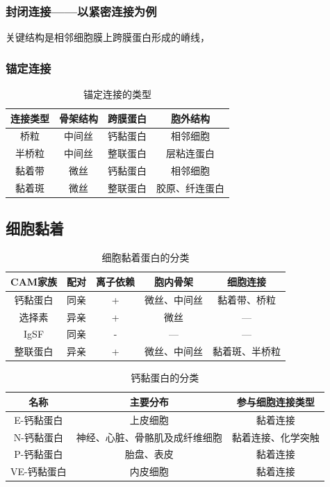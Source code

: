 \subsubsection{封闭连接——以紧密连接为例}

关键结构是相邻细胞膜上跨膜蛋白形成的嵴线，

\subsubsection{锚定连接}

\begin{table}[htbp]
	\centering
	\begin{tabularx}{\textwidth}{|c|C|C|c|}
		\hline
		连接类型 & 骨架结构 & 跨膜蛋白 & 胞外结构 \\ \hline
		桥粒 & 中间丝 & 钙黏蛋白 & 相邻细胞 \\ \hline
		半桥粒 & 中间丝 & 整联蛋白 & 层粘连蛋白 \\ \hline
		黏着带 & 微丝 & 钙黏蛋白 & 相邻细胞 \\ \hline
		黏着斑 & 微丝 & 整联蛋白 & 胶原、纤连蛋白 \\ \hline
	\end{tabularx}
	\caption{锚定连接的类型}
	\label{tab:锚定连接的类型}
\end{table}

\subsection{细胞黏着}

\begin{table}[htbp]
	\centering
	\begin{tabularx}{\textwidth}{|c|C|C|C|c|}
		\hline
		CAM家族 & 配对 & 离子依赖 & 胞内骨架 & 细胞连接 \\ \hline
		钙黏蛋白 & 同亲 & + & 微丝、中间丝 & 黏着带、桥粒 \\ \hline
		选择素 & 异亲 & + & 微丝 & --- \\ \hline
		IgSF & 同亲 & - & --- & --- \\ \hline
		整联蛋白 & 异亲 & + & 微丝、中间丝 & 黏着斑、半桥粒 \\ \hline
	\end{tabularx}
	\caption{细胞黏着蛋白的分类}
	\label{tab:细胞黏着蛋白的分类}
\end{table}

\begin{table}[htbp]
	\centering
	\begin{tabularx}{\textwidth}{|c|C|c|}
		\hline
		名称 & 主要分布 & 参与细胞连接类型 \\ \hline
		E-钙黏蛋白 & 上皮细胞 & 黏着连接 \\ \hline
		N-钙黏蛋白 & 神经、心脏、骨骼肌及成纤维细胞 & 黏着连接、化学突触 \\ \hline
		P-钙黏蛋白 & 胎盘、表皮 & 黏着连接 \\ \hline
		VE-钙黏蛋白 & 内皮细胞 & 黏着连接 \\ \hline
	\end{tabularx}
	\caption{钙黏蛋白的分类}
	\label{tab:钙黏蛋白的分类}
\end{table}